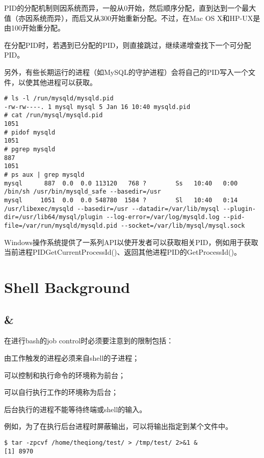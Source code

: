PID的分配机制则因系统而异，一般从0开始，然后顺序分配，直到达到一个最大值（亦因系统而异），而后又从300开始重新分配。不过，在Mac OS X和HP-UX是由100开始重分配。

在分配PID时，若遇到已分配的PID，则直接跳过，继续递增查找下一个可分配PID。

另外，有些长期运行的进程（如MySQL的守护进程）会将自己的PID写入一个文件，以使其他进程可以获取。

\begin{verbatim}
# ls -l /run/mysqld/mysqld.pid
-rw-rw----. 1 mysql mysql 5 Jan 16 10:40 mysqld.pid
# cat /run/mysql/mysqld.pid
1051
# pidof mysqld
1051
# pgrep mysqld
887
1051
# ps aux | grep mysqld
mysql      887  0.0  0.0 113120   768 ?        Ss   10:40   0:00 /bin/sh /usr/bin/mysqld_safe --basedir=/usr
mysql     1051  0.0  0.0 548780  1584 ?        Sl   10:40   0:14 /usr/libexec/mysqld --basedir=/usr --datadir=/var/lib/mysql --plugin-dir=/usr/lib64/mysql/plugin --log-error=/var/log/mysqld.log --pid-file=/var/run/mysqld/mysqld.pid --socket=/var/lib/mysql/mysql.sock
\end{verbatim}



Windows操作系统提供了一系列API以使开发者可以获取相关PID，例如用于获取当前进程PIDGetCurrentProcessId()、返回其他进程PID的GetProcessId()。



\chapter{Shell Background}

\section{\&}


在进行bash的job control时必须要注意到的限制包括：

\begin{compactitem}
\item 由工作触发的进程必须来自shell的子进程；
\item 可以控制和执行命令的环境称为前台；
\item 可以自行执行工作的环境称为后台；
\item 后台执行的进程不能等待终端或shell的输入。
\end{compactitem}

例如，为了在执行后台进程时屏蔽输出，可以将输出指定到某个文件中。

\begin{verbatim}
$ tar -zpcvf /home/theqiong/test/ > /tmp/test/ 2>&1 &
[1] 8970
\end{verbatim}

